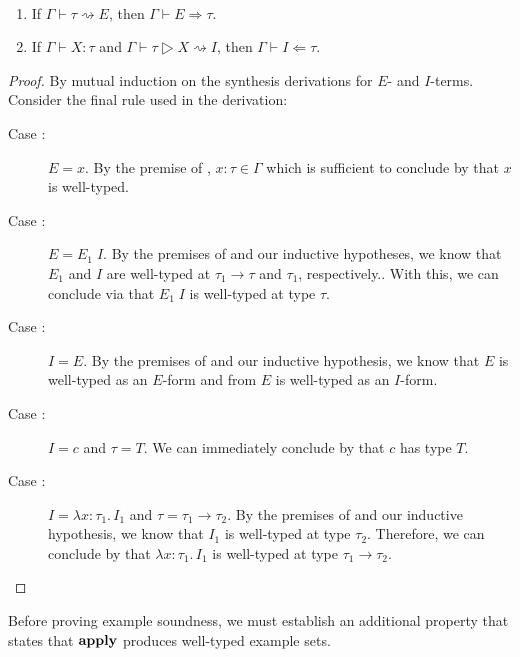 \begin{lemma}\ %
  \begin{enumerate}
    \item If $Γ ⊢ τ ⇝ E$, then $Γ ⊢ E ⇒ τ$.
    \item If $Γ ⊢ Χ : τ$ and $Γ ⊢ τ ▷ Χ ⇝ I$, then $Γ ⊢ I ⇐ τ$.
  \end{enumerate}
\end{lemma}
\begin{proof}
  By mutual induction on the synthesis derivations for $E$- and $I$-terms.
  Consider the final rule used in the derivation:
  \begin{description}
    \item[Case :]
      $E = x$.
      By the premise of , $x{:}τ ∈ Γ$ which is sufficient to conclude by  that $x$ is well-typed.
    \item[Case :]
      $E = E_1\;I$.
      By the premises of  and our inductive hypotheses, we know that $E_1$ and $I$ are well-typed at $τ_1 → τ$ and $τ_1$, respectively..
      With this, we can conclude via  that $E_1\;I$ is well-typed at type $τ$.
    \item[Case :]
      $I = E$.
      By the premises of  and our inductive hypothesis, we know that $E$ is well-typed as an $E$-form and from  $E$ is well-typed as an $I$-form.
    \item[Case :]
      $I = c$ and $τ = T$.
      We can immediately conclude by  that $c$ has type $T$.
    \item[Case :]
      $I = λx{:}τ_1.\,I_1$ and $τ = τ_1 → τ_2$.
      By the premises of  and our inductive hypothesis, we know that $I_1$ is well-typed at type $τ_2$.
      Therefore, we can conclude by  that $λx{:}τ_1.\,I_1$ is well-typed at type $τ_1 → τ_2$.
  \end{description}
\end{proof}

Before proving example soundness, we must establish an additional property that states that $\mathbf{apply}$ produces well-typed example sets.

